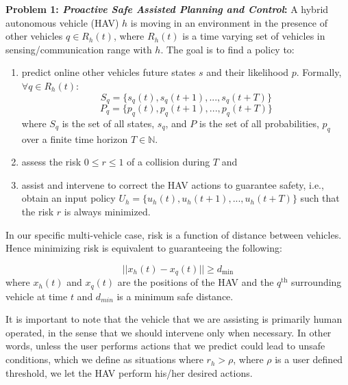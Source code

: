 \documentclass[letterpaper, 10 pt, conference]{ieeeconf}  %
\newcommand\NB[1]{$\spadesuit$\footnote{NB: #1}}
\newcommand*{\N}{\mathbb{N}}
\begin{document}
\textbf{Problem 1: \textit{Proactive Safe Assisted Planning and Control}:} 
      A hybrid autonomous vehicle (HAV) $h$ is moving in an environment in the presence of other vehicles $q \in R_h(t)$, where $R_h(t)$ is a time varying set of vehicles in sensing/communication range with $h$. The goal is to find a policy to:
    \begin{enumerate}
        \item  predict online other vehicles future states $s$ and their likelihood $p$. Formally, $\forall q \in R_h(t)$:
    \begin{equation}
   S_q=\{{s_q(t), s_q(t+1),..., s_q(t+T)}\}
       \end{equation}
       \begin{equation}
   P_q=\{{p_q(t), p_q(t+1),..., p_q(t+T)}\}
    \end{equation}
     where $S_q$ is the set of all states, $s_q$, and $P$ is the set of all probabilities, $p_q$ over a finite time horizon $T\in\N$.  
    \item assess the risk $0\leq r \leq1$ of a collision during $T$ and
    \item assist and intervene to correct the HAV actions to guarantee safety, i.e., obtain an input policy $U_h=\{{u_h(t), u_h(t+1),..., u_h(t+T)}\}$ such that the risk $r$ is always minimized. 
    \end{enumerate}
   In our specific multi-vehicle case, risk is a function of distance between vehicles. Hence minimizing risk is equivalent to guaranteeing the following:
    
    \begin{equation}
        ||{x_h(t)-x_q(t)}|| \geq d_{\textrm{min}}
    \end{equation}
     where $x_h(t)$ and $x_q(t)$ are the positions of the HAV and the $q^{\textrm{th}}$ surrounding vehicle at time $t$ and $d_{min}$ is a minimum safe distance.    
    
    It is important to note that the vehicle that we are assisting is primarily human operated, in the sense that we should intervene only when necessary. %
    In other words, unless the user performs actions that we predict could lead to unsafe conditions, which we define as situations where $r_h>\rho$, where $\rho$ is a user defined threshold, we let the HAV perform his/her desired actions.
\end{document}

